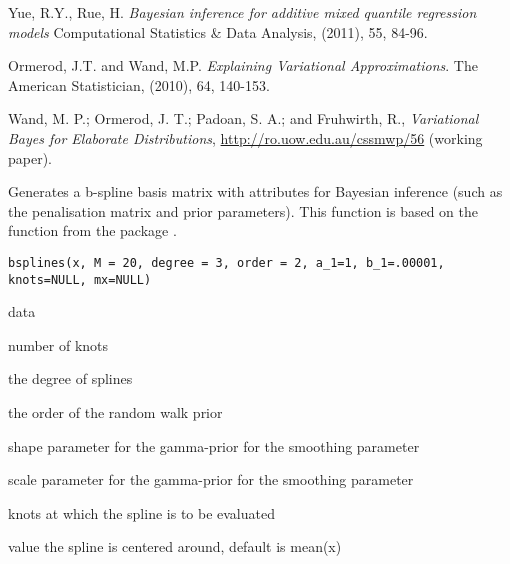 \documentclass[a4paper]{book}
\begin{document}
%
\begin{References}\relax
Yue, R.Y., Rue, H. \emph{Bayesian inference for additive mixed quantile regression models} Computational Statistics \& Data Analysis, (2011),   55, 84-96.


Ormerod, J.T. and Wand, M.P.
\emph{Explaining Variational Approximations}.
The American Statistician, (2010), 64, 140-153. 

Wand, M. P.; Ormerod, J. T.; Padoan, S. A.; and Fruhwirth, R., \emph{Variational Bayes for Elaborate Distributions},
\url{http://ro.uow.edu.au/cssmwp/56} (working paper).


\end{References}
%
\begin{SeeAlso}\relax
{}
\end{SeeAlso}
%
\begin{Description}\relax

Generates a b-spline basis matrix with attributes for Bayesian inference (such as the penalisation matrix and prior parameters). This function is based on the function  from the package .
\end{Description}
%
\begin{Usage}
\begin{verbatim}
bsplines(x, M = 20, degree = 3, order = 2, a_1=1, b_1=.00001, knots=NULL, mx=NULL)
\end{verbatim}
\end{Usage}
%
\begin{Arguments}
\begin{ldescription}
\item[\code{x}] data
\item[\code{M}] number of knots
\item[\code{degree}] the degree of splines
\item[\code{order}] the order of the random walk prior
\item[\code{a\_1}] shape parameter for the gamma-prior for the smoothing parameter
\item[\code{b\_1}] scale parameter for the gamma-prior for the smoothing parameter
\item[\code{knots}] knots at which the spline is to be evaluated
\item[\code{mx}] value the spline is centered around, default is mean(x)
\end{ldescription}
\end{Arguments}
\end{document}
